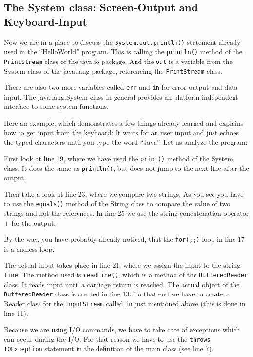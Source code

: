 \subsection{The System class: Screen-Output and Keyboard-Input}

Now we are in a place to discuss the \verb|System.out.println()| statement
already used in the ``HelloWorld'' program. This is calling the
\verb|println()| method of the \verb|PrintStream| class of the java.io 
package. And the \verb|out| is a variable from the System 
class of the java.lang package, referencing the \verb|PrintStream| class. 

There are also two more variables called \verb|err| and
\verb|in| for error output and data input. 
The java.lang.System class in general provides an platform-independent 
interface to some system functions.

Here an example, which demonstrates a few things already learned and
explains how to get input from the keyboard:
It waits for an user input and just echoes the typed characters
until you type the word ``Java''. Let us analyze the program:

First look at line 19, where we have used the \verb|print()| method
of the System class. It does the same as \verb|println()|, but does not
jump to the next line after the output.

Then take a look at line 23, where we compare two strings. As you see
you have to use the \verb|equals()| method of the String class to
compare the value of two strings and not the references. 
In line 25 we use the string concatenation operator $+$ for the output.

By the way, you have probably already noticed, that 
the \verb|for(;;)| loop in line 17 is a endless loop.

The actual input takes place in line 21, where we assign the input
to the string \verb|line|. The method used is \verb|readLine()|, which
is a method of the \verb|BufferedReader| class. It reads input until
a carriage return is reached. The actual object of the 
\verb|BufferedReader| class is created in line 13. To that end we have
to create a Reader class for the \verb|InputStream| called \verb|in|
just mentioned above (this is done in line 11).

Because we are using I/O commands, we have to take care of exceptions
which can occur during the I/O. For that reason we have to use the
\verb|throws IOException| statement in the definition of the main
class (see line 7).

